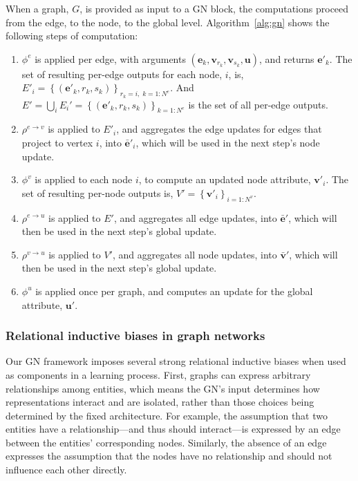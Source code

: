 \documentclass[10pt]{book}
\newcommand{\uv}{\mathbf{u}}    %
\newcommand{\ev}{\mathbf{e}}    %
\newcommand{\vv}{\mathbf{v}}    %
\begin{document}
When a graph, $G$, is provided as input to a GN block, the computations proceed from the edge, to the node, to the global level. Algorithm~\ref{alg:gn} shows the following steps of computation:
\begin{enumerate}[noitemsep]
    \item $\phi^e$ is applied per edge, with arguments $(\ev_k, \vv_{r_k}, \vv_{s_k}, \uv)$, and returns $\ev'_k$. The set of resulting per-edge outputs for each node, $i$, is, $E'_i = \left\{\left(\mathbf{e}'_k, r_k, s_k \right)\right\}_{r_k=i,\; k=1:N^e}$. And $E' = \bigcup_i E_i' = \left\{\left(\mathbf{e}'_k, r_k, s_k \right)\right\}_{k=1:N^e}$ is the set of all per-edge outputs.
    
    \item $\rho^{e\rightarrow v}$ is applied to $E'_i$, and aggregates the edge updates for edges that project to vertex $i$, into $\mathbf{\bar{e}}'_i$, which will be used in the next step's node update.
    
    \item $\phi^v$ is applied to each node $i$, to compute an updated node attribute, $\mathbf{v}'_i$. The set of resulting per-node outputs is, $V'=\left\{\mathbf{v}'_i\right\}_{i=1:N^v}$.
    
    \item $\rho^{e\rightarrow u}$ is applied to $E'$, and aggregates all edge updates, into $\mathbf{\bar{e}}'$, which will then be used in the next step's global update.
    
    \item $\rho^{v \rightarrow u}$ is applied to $V'$, and aggregates all node updates, into $\mathbf{\bar{v}}'$, which will then be used in the next step's global update.
    
    \item $\phi^u$ is applied once per graph, and computes an update for the global attribute, $\uv'$.
\end{enumerate}

\subsubsection{Relational inductive biases in graph networks}

Our GN framework imposes several strong relational inductive biases when used as components in a learning process.
First, graphs can express arbitrary relationships among entities, which means the GN's input determines how representations interact and are isolated, rather than those choices being determined by the fixed architecture. For example, the assumption that two entities have a relationship---and thus should interact---is expressed by an edge between the entities' corresponding nodes. Similarly, the absence of an edge expresses the assumption that the nodes have no relationship and should not influence each other directly. 
\end{document}
